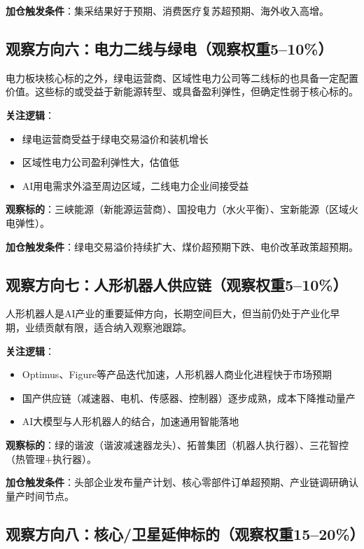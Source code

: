 \textbf{加仓触发条件}：集采结果好于预期、消费医疗复苏超预期、海外收入高增。

\subsection{观察方向六：电力二线与绿电（观察权重5--10\%）}

电力板块核心标的之外，绿电运营商、区域性电力公司等二线标的也具备一定配置价值。这些标的或受益于新能源转型、或具备盈利弹性，但确定性弱于核心标的。

\textbf{关注逻辑}：
\vspace{0.2em}
\begin{itemize}[leftmargin=2em]
\item 绿电运营商受益于绿电交易溢价和装机增长
\item 区域性电力公司盈利弹性大，估值低
\item AI用电需求外溢至周边区域，二线电力企业间接受益
\end{itemize}

\textbf{观察标的}：三峡能源（新能源运营商）、国投电力（水火平衡）、宝新能源（区域火电弹性）。

\textbf{加仓触发条件}：绿电交易溢价持续扩大、煤价超预期下跌、电价改革政策超预期。

\subsection{观察方向七：人形机器人供应链（观察权重5--10\%）}

人形机器人是AI产业的重要延伸方向，长期空间巨大，但当前仍处于产业化早期，业绩贡献有限，适合纳入观察池跟踪。

\textbf{关注逻辑}：
\vspace{0.2em}
\begin{itemize}[leftmargin=2em]
\item Optimus、Figure等产品迭代加速，人形机器人商业化进程快于市场预期
\item 国产供应链（减速器、电机、传感器、控制器）逐步成熟，成本下降推动量产
\item AI大模型与人形机器人的结合，加速通用智能落地
\end{itemize}

\textbf{观察标的}：绿的谐波（谐波减速器龙头）、拓普集团（机器人执行器）、三花智控（热管理+执行器）。

\textbf{加仓触发条件}：头部企业发布量产计划、核心零部件订单超预期、产业链调研确认量产时间节点。

\subsection{观察方向八：核心/卫星延伸标的（观察权重15--20\%）}

